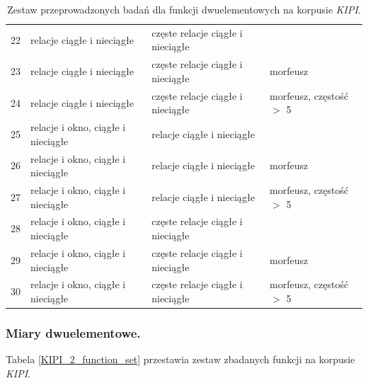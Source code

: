 \documentclass[11pt,a4paper]{llncs}
\begin{document}
\begin{table}[h!]
\begin{tabular}{ l || l | l | l }
	22	& relacje ciągłe i nieciągłe			& częste relacje ciągłe i nieciągłe	& 							\\
	23	& relacje ciągłe i nieciągłe			& częste relacje ciągłe i nieciągłe	& morfeusz					\\
	24	& relacje ciągłe i nieciągłe			& częste relacje ciągłe i nieciągłe	& morfeusz, częstość $>$ 5	\\
	25	& relacje i okno, ciągłe i nieciągłe	& relacje ciągłe i nieciągłe		&							\\
	26	& relacje i okno, ciągłe i nieciągłe	& relacje ciągłe i nieciągłe		& morfeusz					\\
	27	& relacje i okno, ciągłe i nieciągłe	& relacje ciągłe i nieciągłe		& morfeusz, częstość $>$ 5	\\
	28	& relacje i okno, ciągłe i nieciągłe	& częste relacje ciągłe i nieciągłe	&							\\
	29	& relacje i okno, ciągłe i nieciągłe	& częste relacje ciągłe	i nieciągłe	& morfeusz					\\
	30	& relacje i okno, ciągłe i nieciągłe	& częste relacje ciągłe	i nieciągłe	& morfeusz, częstość $>$ 5	\\
	\bottomrule
\end{tabular}
\caption[Zestaw przeprowadzonych badań dla funkcji dwuelementowych na korpusie \emph{KIPI}]{Zestaw przeprowadzonych badań dla funkcji dwuelementowych na korpusie \emph{KIPI}.}
\label{KIPI_2_research_types}
\end{table}

\subsubsection{Miary dwuelementowe.}
Tabela \ref{KIPI_2_function_set} przestawia zestaw zbadanych funkcji na korpusie \emph{KIPI}.
\end{document}
